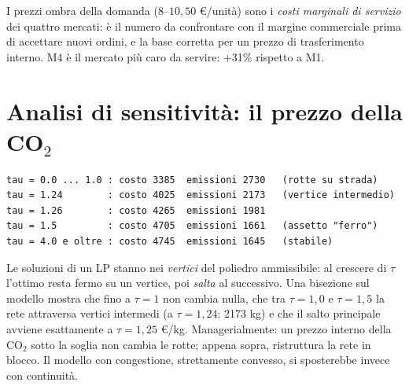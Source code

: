 \begin{insight}
I prezzi ombra della domanda ($8$--$10{,}50$ \euro/unità) sono i \emph{costi marginali
di servizio} dei quattro mercati: è il numero da confrontare con il margine commerciale
prima di accettare nuovi ordini, e la base corretta per un prezzo di trasferimento
interno. M4 è il mercato più caro da servire: +31\% rispetto a M1.
\end{insight}

\section{Analisi di sensitività: il prezzo della CO$_2$}

\begin{center}
\end{center}

\begin{lstlisting}[style=output]
tau = 0.0 ... 1.0 : costo 3385  emissioni 2730   (rotte su strada)
tau = 1.24        : costo 4025  emissioni 2173   (vertice intermedio)
tau = 1.26        : costo 4265  emissioni 1981
tau = 1.5         : costo 4705  emissioni 1661   (assetto "ferro")
tau = 4.0 e oltre : costo 4745  emissioni 1645   (stabile)
\end{lstlisting}

\begin{spiegazione}
Le soluzioni di un LP stanno nei \emph{vertici} del poliedro ammissibile: al crescere
di $\tau$ l'ottimo resta fermo su un vertice, poi \emph{salta} al successivo. Una
bisezione sul modello mostra che fino a $\tau = 1$ non cambia nulla, che tra
$\tau = 1{,}0$ e $\tau = 1{,}5$ la rete attraversa vertici intermedi
(a $\tau = 1{,}24$: 2173 kg) e che il salto principale avviene esattamente a
$\tau = 1{,}25$ \euro/kg. Managerialmente: un prezzo interno della CO$_2$ sotto la
soglia non cambia le rotte; appena sopra, ristruttura la rete in blocco. Il modello
con congestione, strettamente convesso, si sposterebbe invece con continuità.
\end{spiegazione}

